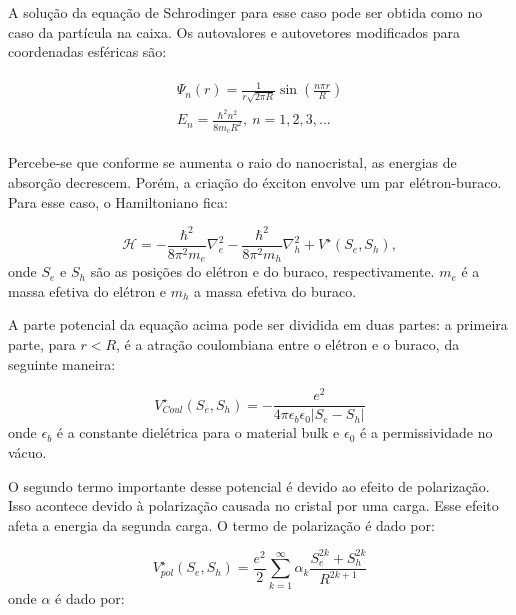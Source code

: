 \par A solução da equação de Schrodinger para esse caso pode ser obtida como no caso da partícula na caixa. Os autovalores e autovetores modificados para coordenadas esféricas são: 

\begin{align}
	\label{confinamento_10}
      \begin{array}{ll}
        \displaystyle \Psi_n(r) = \frac{1}{r\sqrt{2\pi R}}\sin\left(\frac{n\pi r}{R}\right)\\
        \displaystyle E_{n} = \frac{\hbar^2 n^2}{8m_{c}R^2},\ n=1,2,3,...
      \end{array}
\end{align}

\par Percebe-se que conforme se aumenta o raio do nanocristal, as energias de absorção decrescem.
Porém, a criação do éxciton envolve um par elétron-buraco. Para esse caso, o Hamiltoniano fica:

\begin{equation}
	\label{confinamento_11}
	\mathcal{H} = -\frac{\hbar^2}{8\pi^2 m_{e}}\nabla^2_{e} - \frac{\hbar^2}{8\pi^2 m_{h}}\nabla^2_{h}
		+ V^{\star}(S_{e}, S_{h}),
\end{equation}
onde $S_{e}$ e $S_{h}$ são as posições do elétron e do buraco, respectivamente. $m_{e}$ é a massa efetiva do elétron e $m_{h}$ a massa efetiva do buraco.

\par A parte potencial da equação acima pode ser dividida em duas partes: a primeira parte, para $r<R$, é a atração coulombiana entre o elétron e o buraco, da seguinte maneira:

\begin{equation}
	\label{confinamento_12}
	V^{\star}_{Coul}(S_{e}, S_{h}) = -\frac{e^2}{4\pi\epsilon_{b}\epsilon_{0}|S_{e} - S_{h}|}
\end{equation}
onde $\epsilon_{b}$ é a constante dielétrica para o material bulk e $\epsilon_{0}$ é a permissividade no vácuo.

\par O segundo termo importante desse potencial é devido ao efeito de polarização. Isso acontece devido à polarização causada no cristal por uma carga. Esse efeito afeta a energia da segunda carga. O termo de polarização é dado por:

\begin{equation}
	\label{confinamento_13}
	V^{\star}_{pol}(S_{e}, S_{h}) = \frac{e^2}{2} \sum_{k=1}^{\infty} \alpha_{k}
		\frac{S_{e}^{2k} + S_{h}^{2k}}{R^{2k+1}}
\end{equation}
onde $\alpha$ é dado por:

